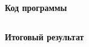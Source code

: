 \textbf{Код программы}

\inputminted[fontsize=\footnotesize, linenos]{python}{final/command_tour/bas/task_06/source_1.py}

\textbf{Итоговый результат}

\inputminted[fontsize=\footnotesize, linenos]{python}{final/command_tour/bas/task_06/source_2.py}